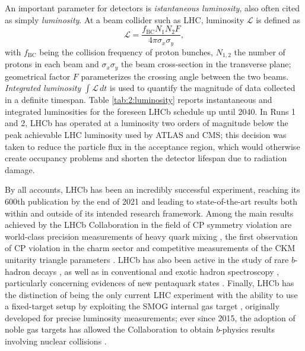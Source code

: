 An important parameter for detectors is \textit{istantaneous luminosity}, also often cited as simply \textit{luminosity}. At a beam collider such as LHC, luminosity $\mathcal{L}$ is defined as
\begin{equation}
\mathcal{L} = \frac{f_\text{BC} N_1 N_2 F}{4\pi\sigma_x\sigma_y},
\end{equation}
with $f_\text{BC}$ being the collision frequency of proton bunches, $N_{1,2}$ the number of protons in each beam and $\sigma_{x} \sigma_y$ the beam cross-section in the transverse plane;
geometrical factor $F$ parameterizes the crossing angle between the two beams.
\textit{Integrated luminosity} $\int\mathcal{L}\,dt$ is used to quantify the magnitude of data collected in a definite timespan.
Table \ref{tab:2:luminosity} reports instantaneous and integrated luminosities for the foreseen LHCb schedule up until 2040.
In Runs 1 and 2, LHCb has operated at a luminosity two orders of magnitude below the peak achievable LHC luminosity used by ATLAS and CMS;
this decision was taken to reduce the particle flux in the acceptance region, which would otherwise create occupancy problems and shorten the detector lifespan due to radiation damage.

By all accounts, LHCb has been an incredibly successful experiment, reaching its 600th publication by the end of 2021 and leading to state-of-the-art results both within and outside of its intended research framework.
Among the main results achieved by the LHCb Collaboration in the field of CP symmetry violation are world-class precision measurements of heavy quark mixing \cite{B0MeasurementPrecise2016} \cite{B0MeasurementPrecise2013}, the first observation of CP violation in the charm sector \cite{PhysRevLett.122.211803} and competitive measurements of the CKM unitarity triangle parameters \cite{LHCb-CONF-2020-003}.
LHCb has also been active in the study of rare $b$-hadron decays \cite{PhysRevLett.118.191801}, as well as in conventional and exotic hadron spectroscopy \cite{DMesonSpectroscopy}, particularly concerning evidences of new pentaquark states \cite{LHCbPentaquark}.
Finally, LHCb has the distinction of being the only current LHC experiment with the ability to use a fixed-target setup by exploiting the SMOG internal gas target \cite{maurice2017fixedtarget}, originally developed for precise luminosity measurements;
ever since 2015, the adoption of noble gas targets has allowed the Collaboration to obtain $b$-physics results involving nuclear collisions \cite{PhysRevLett.122.132002}.


